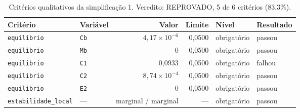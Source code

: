 \begin{table}[htbp]
\centering
\caption{Critérios qualitativos da simplificação 1. Veredito: REPROVADO, 5 de 6 critérios (83,3\%).}
\label{tab:simp1-qualitativos}
\begin{tabular}{llrrll}
\toprule
Critério & Variável & Valor & Limite & Nível & Resultado \\
\midrule
\texttt{equilibrio} & \texttt{Cb} & $4{,}17 \times 10^{-6}$ & 0{,}0500 & obrigatório & passou \\
\texttt{equilibrio} & \texttt{Mb} & 0 & 0{,}0500 & obrigatório & passou \\
\texttt{equilibrio} & \texttt{C1} & 0{,}0933 & 0{,}0500 & obrigatório & falhou \\
\texttt{equilibrio} & \texttt{C2} & $8{,}74 \times 10^{-4}$ & 0{,}0500 & obrigatório & passou \\
\texttt{equilibrio} & \texttt{E2} & 0 & 0{,}0500 & obrigatório & passou \\
\texttt{estabilidade\_local} & --- & marginal / marginal & --- & obrigatório & passou \\
\bottomrule
\end{tabular}
\end{table}
